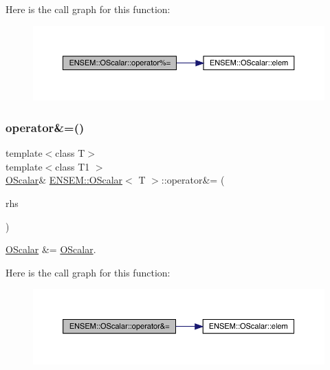 Here is the call graph for this function\+:
\nopagebreak
\begin{figure}[H]
\begin{center}
\leavevmode
\includegraphics[width=350pt]{da/d80/classENSEM_1_1OScalar_a89a76b1229e185250c0b9c48ae13d98b_cgraph}
\end{center}
\end{figure}
\mbox{\label{classENSEM_1_1OScalar_a9a192875355f059d207c579e2514b2a3}} 
\subsubsection{\texorpdfstring{operator\&=()}{operator\&=()}\hspace{0.1cm}{\footnotesize\ttfamily [1/2]}}
{\footnotesize\ttfamily template$<$class T$>$ \\
template$<$class T1 $>$ \\
\mbox{\hyperlink{classENSEM_1_1OScalar}{O\+Scalar}}\& \mbox{\hyperlink{classENSEM_1_1OScalar}{E\+N\+S\+E\+M\+::\+O\+Scalar}}$<$ T $>$\+::operator\&= (\begin{DoxyParamCaption}\item[{const \mbox{\hyperlink{classENSEM_1_1OScalar}{O\+Scalar}}$<$ T1 $>$ \&}]{rhs }\end{DoxyParamCaption})\hspace{0.3cm}{\ttfamily [inline]}}



\mbox{\hyperlink{classENSEM_1_1OScalar}{O\+Scalar}} \&= \mbox{\hyperlink{classENSEM_1_1OScalar}{O\+Scalar}}. 

Here is the call graph for this function\+:
\nopagebreak
\begin{figure}[H]
\begin{center}
\leavevmode
\includegraphics[width=350pt]{da/d80/classENSEM_1_1OScalar_a9a192875355f059d207c579e2514b2a3_cgraph}
\end{center}
\end{figure}
\mbox{\label{classENSEM_1_1OScalar_a9a192875355f059d207c579e2514b2a3}} 
